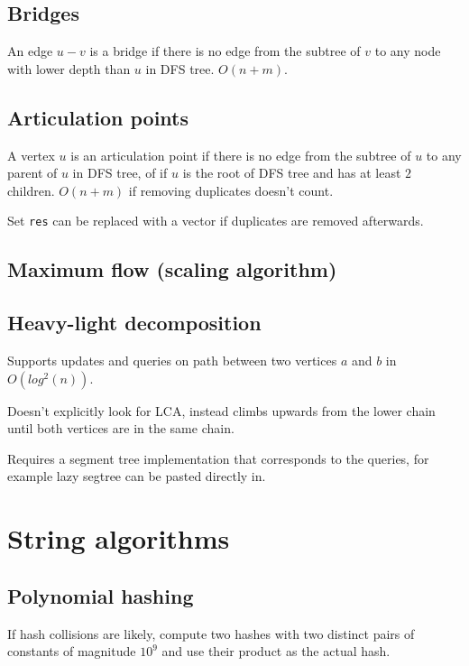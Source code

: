 \documentclass{article}
\begin{document}
\subsection {Bridges}

An edge $u-v$ is a bridge if there is no edge from the subtree of $v$ to any node with lower depth than $u$ in DFS tree. $O(n+m)$.



\subsection {Articulation points}

A vertex $u$ is an articulation point if there is no edge from the subtree of $u$ to any parent of $u$ in DFS tree, of if $u$ is the root of DFS tree and has at least $2$ children. $O(n+m)$ if removing duplicates doesn't count.

Set \texttt{res} can be replaced with a vector if duplicates are removed afterwards.



\subsection {Maximum flow (scaling algorithm)}

\subsection {Heavy-light decomposition}

Supports updates and queries on path between two vertices $a$ and $b$ in $O(log^2(n))$.

Doesn't explicitly look for LCA, instead climbs upwards from the lower chain until both vertices are in the same chain.

Requires a segment tree implementation that corresponds to the queries, for example lazy segtree can be pasted directly in.



\section {String algorithms}

\subsection {Polynomial hashing}

If hash collisions are likely, compute two hashes with two distinct pairs of constants of magnitude $10^9$ and use their product as the actual hash.


\end{document}
